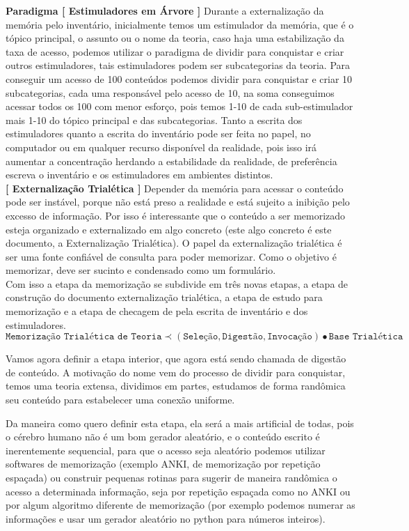\documentclass[10pt,a4paper]{report}
\begin{document}
\textbf{Paradigma [ Estimuladores em Árvore ]} Durante a externalização da memória pelo inventário, inicialmente temos um estimulador da memória, que é o tópico principal, o assunto ou o nome da teoria, caso haja uma estabilização da taxa de acesso, podemos utilizar o paradigma de dividir para conquistar e criar outros estimuladores, tais estimuladores podem ser subcategorias da teoria. Para conseguir um acesso de 100 conteúdos podemos dividir para conquistar e criar 10 subcategorias, cada uma responsável pelo acesso de 10, na soma conseguimos acessar todos os 100 com menor esforço, pois temos 1-10 de cada sub-estimulador mais 1-10 do tópico principal e das subcategorias. Tanto a escrita dos estimuladores quanto a escrita do inventário pode ser feita no papel, no computador ou em qualquer recurso disponível da realidade, pois isso irá aumentar a concentração herdando a estabilidade da realidade, de preferência escreva o inventário e os estimuladores em ambientes distintos.\\

\textbf{[ Externalização Trialética ]} Depender da memória para acessar o conteúdo pode ser instável, porque não está preso a realidade e está sujeito a inibição pelo excesso de informação. Por isso é interessante que o conteúdo a ser memorizado esteja organizado e externalizado em algo concreto (este algo concreto é este documento, a Externalização Trialética). O papel da externalização trialética é ser uma fonte confiável de consulta para poder memorizar. Como o objetivo é memorizar, deve ser sucinto e condensado como um formulário.\\

Com isso a etapa da memorização se subdivide em três novas etapas, a etapa de construção do documento externalização trialética, a etapa de estudo para memorização e a etapa de checagem de pela escrita de inventário e dos estimuladores.
$$ \texttt{Memorização Trialética de Teoria} \prec (\texttt{Seleção}, \texttt{Digestão}, \texttt{Invocação}) \bullet \texttt{Base Trialética} $$

Vamos agora definir a etapa interior, que agora está sendo chamada de digestão de conteúdo. A motivação do nome vem do processo de dividir para conquistar, temos uma teoria extensa, dividimos em partes, estudamos de forma randômica seu conteúdo para estabelecer uma conexão uniforme.

Da maneira como quero definir esta etapa, ela será a mais artificial de todas, pois o cérebro humano não é um bom gerador aleatório, e o conteúdo escrito é inerentemente sequencial, para que o acesso seja aleatório podemos utilizar softwares de memorização (exemplo ANKI, de memorização por repetição espaçada) ou construir pequenas rotinas para sugerir de maneira randômica o acesso a determinada informação, seja por repetição espaçada como no ANKI ou por algum algoritmo diferente de memorização (por exemplo podemos numerar as informações e usar um gerador aleatório no python para números inteiros).
\end{document}
